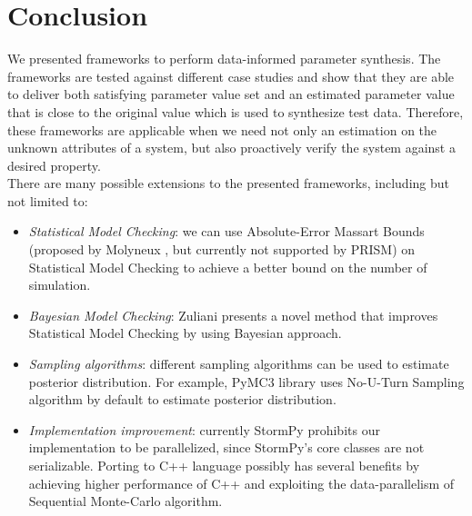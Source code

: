 \chapter{Conclusion}
We presented frameworks to perform data-informed parameter synthesis. The frameworks are tested
against different case studies and show that they are able to deliver both satisfying parameter
value set and an estimated parameter value that is close to the original value which is used to
synthesize test data. Therefore, these frameworks are applicable when we need not only an estimation
on the unknown attributes of a system, but also proactively verify the system against a desired property.\\
There are many possible extensions to the presented frameworks, including but not limited to:
\begin{itemize}
    \item \textit{Statistical Model Checking}: we can use Absolute-Error Massart Bounds (proposed by
          Molyneux \cite{molyneux2020abc}, but currently not supported by PRISM) on Statistical
          Model Checking to achieve a better bound on the number of simulation.
    \item \textit{Bayesian Model Checking}: Zuliani \cite{zuliani2013bayesian} presents a novel method that
          improves Statistical Model Checking by using Bayesian approach.
    \item \textit{Sampling algorithms}: different sampling algorithms can be used to estimate
          posterior distribution. For example, PyMC3 library \cite{salvatier2016pymc3} uses
          No-U-Turn Sampling algorithm by default to estimate posterior distribution.
    \item \textit{Implementation improvement}: currently StormPy prohibits our implementation to be
          parallelized, since StormPy's core classes are not serializable. Porting to C++ language
          possibly has several benefits by achieving higher performance of C++ and exploiting the
          data-parallelism of Sequential Monte-Carlo algorithm.
\end{itemize}